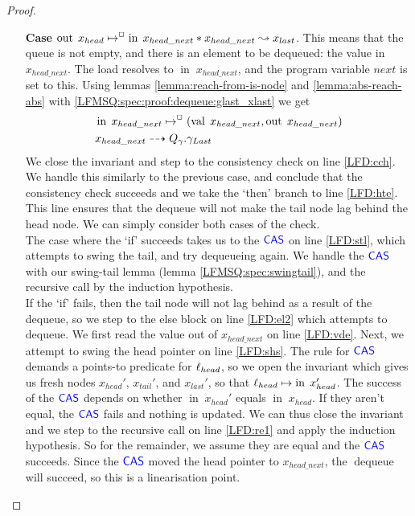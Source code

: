 \documentclass[a4paper, 11pt]{report}
\newcommand{\dequeue}{\operatorname{dequeue}}
\newcommand{\nIn}[1]{\operatorname{in} \; #1}
\newcommand{\nVal}[1]{\operatorname{val} \; #1}
\newcommand{\nOut}[1]{\operatorname{out} \; #1}
\newcommand{\Qg}{Q_\gname}
\newcommand{\isNode}[1]{\nIn{#1} \mapsto^{\persistently} (\nVal{#1}, \nOut{#1})}
\newcommand{\reach}[2]{#1 \leadsto #2}
\newcommand{\ar}[2]{#1 \dashrightarrow #2}
\begin{document}
\begin{proof}
\begin{itemize}
\begin{itemize}
      \item[\textbf{Case}] $\nOut{x_{head} \mapsto^{\persistently} \nIn{x_{head\_next}}} \star \reach{x_{head\_next}}{x_{last}}$. This means that the queue is not empty, and there is an element to be dequeued: the value in $x_{head\_next}$. The load resolves to $\nIn{x_{head\_next}}$, and the program variable $next$ is set to this. Using lemmas \ref{lemma:reach-from-is-node} and \ref{lemma:abs-reach-abs} with \ref{LFMSQ:spec:proof:dequeue:glast_xlast} we get
      \begin{align}
        &\isNode{x_{head\_next}}\label{LFMSQ:spec:proof:dequeue:x_headnext_node}\\
        &\ar{x_{head\_next}}{\Qg.\gname_{Last}}\label{LFMSQ:spec:proof:dequeue:x_headnext_glast}
      \end{align}
      We close the invariant and step to the consistency check on line \ref{LFD:cch}. We handle this similarly to the previous case, and conclude that the consistency check succeeds and we take the `then' branch to line \ref{LFD:hte}. This line ensures that the dequeue will not make the tail node lag behind the head node. We can simply consider both cases of the check.\\
      The case where the `if' succeeds takes us to the $\textsf{\color{blue} CAS}$ on line \ref{LFD:stl}, which attempts to swing the tail, and try dequeueing again. We handle the $\textsf{\color{blue} CAS}$ with our swing-tail lemma (lemma \ref{LFMSQ:spec:swingtail}), and the recursive call by the induction hypothesis.\\
      If the `if' fails, then the tail node will not lag behind as a result of the dequeue, so we step to the else block on line \ref{LFD:el2} which attempts to dequeue. We first read the value out of $x_{head\_next}$ on line \ref{LFD:vde}. Next, we attempt to swing the head pointer on line \ref{LFD:shs}. The rule for $\textsf{\color{blue} CAS}$ demands a points-to predicate for $\ell_{head}$, so we open the invariant which gives us fresh nodes $x_{head}'$, $x_{tail}'$, and $x_{last}'$, so that $\loc_{head} \mapsto \nIn{x_{head}}'$. The success of the $\textsf{\color{blue} CAS}$ depends on whether $\nIn{x_{head}'}$ equals $\nIn{x_{head}}$. If they aren't equal, the $\textsf{\color{blue} CAS}$ fails and nothing is updated. We can thus close the invariant and we step to the recursive call on line \ref{LFD:re1} and apply the induction hypothesis. So for the remainder, we assume they are equal and the $\textsf{\color{blue} CAS}$ succeeds. Since the $\textsf{\color{blue} CAS}$ moved the head pointer to $x_{head\_next}$, the $\dequeue$ will succeed, so this is a linearisation point.\\

\end{itemize}
\end{itemize}
\end{proof}
\end{document}
